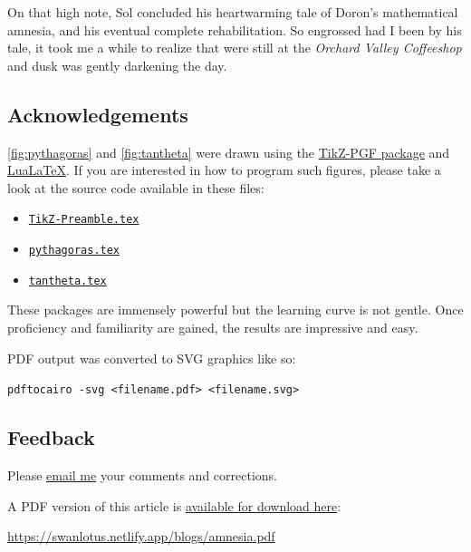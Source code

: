 \documentclass[
  a4paper,
]{article}
\providecommand{\tightlist}{%
  \setlength{\itemsep}{0pt}\setlength{\parskip}{0pt}}
\begin{document}
On that high note, Sol concluded his heartwarming tale of Doron's
mathematical amnesia, and his eventual complete rehabilitation. So
engrossed had I been by his tale, it took me a while to realize that
were still at the \emph{Orchard Valley Coffeeshop} and dusk was gently
darkening the day.

\subsection{Acknowledgements}\label{acknowledgements}

\cref{fig:pythagoras} and \cref{fig:tantheta} were drawn using the
\href{https://en.wikipedia.org/wiki/PGF/TikZ}{TikZ-PGF package} and
\href{https://en.wikipedia.org/wiki/LuaTeX}{LuaLaTeX}. If you are
interested in how to program such figures, please take a look at the
source code available in these files:

\begin{itemize}
\tightlist
\item
  \href{auxiliary/TikZ-Preamble.tex}{\texttt{TikZ-Preamble.tex}}
\item
  \href{auxiliary/pythagoras.tex}{\texttt{pythagoras.tex}}
\item
  \href{auxiliary/tantheta.tex}{\texttt{tantheta.tex}}
\end{itemize}

These packages are immensely powerful but the learning curve is not
gentle. Once proficiency and familiarity are gained, the results are
impressive and easy.

PDF output was converted to SVG graphics like so:

\texttt{pdftocairo\ -svg\ \textless{}filename.pdf\textgreater{}\ \textless{}filename.svg\textgreater{}}

\subsection{Feedback}\label{feedback}

Please \href{mailto:feedback.swanlotus@gmail.com}{email me} your
comments and corrections.

\noindent A PDF version of this article is
\href{./amnesia.pdf}{available for download here}:

\begin{small}

\begin{sffamily}

\url{https://swanlotus.netlify.app/blogs/amnesia.pdf}

\end{sffamily}

\end{small}
\end{document}
